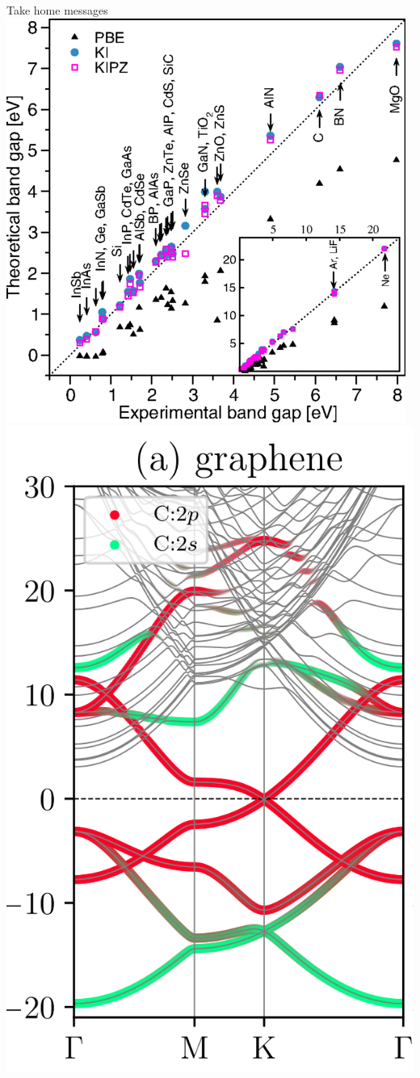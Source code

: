 \documentclass[xcolor=table,aspectratio=169]{beamer}
\numberwithin{equation}{section}
\begin{document}
\begin{frame}{Take home messages}
   \includegraphics[height=0.25\paperheight]{figures/fig_nguyen_prx_bandgaps.png}
   \hfill
   \includegraphics[height=0.275\paperheight]{figures/proj_disentanglement_fig1a.png}

\end{frame}
\end{document}
